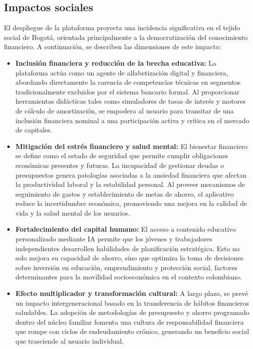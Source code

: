{}
\subsection*{Impactos sociales}


El despliegue de la plataforma proyecta una incidencia significativa en el tejido social de Bogotá, orientada principalmente a la democratización del conocimiento financiero. A continuación, se describen las dimensiones de este impacto:

\begin{itemize}
	\item \textbf{Inclusión financiera y reducción de la brecha educativa:} La plataforma actúa como un agente de alfabetización digital y financiera, abordando directamente la carencia de competencias técnicas en segmentos tradicionalmente excluidos por el sistema bancario formal. Al proporcionar herramientas didácticas tales como simuladores de tasas de interés y motores de cálculo de amortización, se empodera al usuario para transitar de una inclusión financiera nominal a una participación activa y crítica en el mercado de capitales.
	
	\item \textbf{Mitigación del estrés financiero y salud mental:} El bienestar financiero se define como el estado de seguridad que permite cumplir obligaciones económicas presentes y futuras. La incapacidad de gestionar deudas o presupuestos genera patologías asociadas a la ansiedad financiera que afectan la productividad laboral y la estabilidad personal. Al proveer mecanismos de seguimiento de gastos y establecimiento de metas de ahorro, el aplicativo reduce la incertidumbre económica, promoviendo una mejora en la calidad de vida y la salud mental de los usuarios.
	
	\item \textbf{Fortalecimiento del capital humano:} El acceso a contenido educativo personalizado mediante IA permite que los jóvenes y trabajadores independientes desarrollen habilidades de planificación estratégica. Esto no solo mejora su capacidad de ahorro, sino que optimiza la toma de decisiones sobre inversión en educación, emprendimiento y protección social, factores determinantes para la movilidad socioeconómica en el contexto colombiano.
	
	\item \textbf{Efecto multiplicador y transformación cultural:} A largo plazo, se prevé un impacto intergeneracional basado en la transferencia de hábitos financieros saludables. La adopción de metodologías de presupuesto y ahorro programado dentro del núcleo familiar fomenta una cultura de responsabilidad financiera que rompe con ciclos de endeudamiento crónico, generando un beneficio social que trasciende al usuario individual.
\end{itemize}